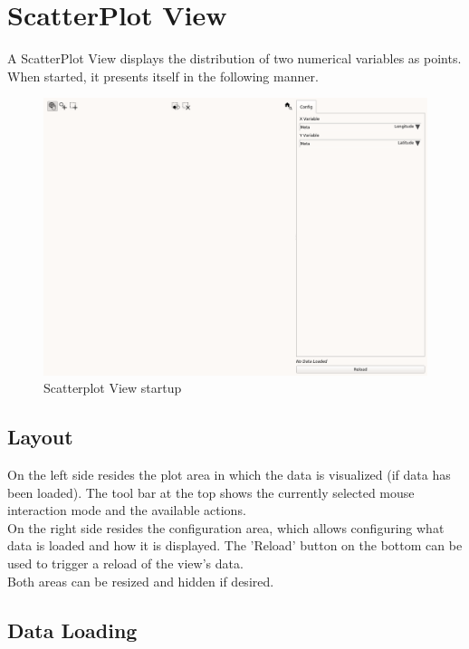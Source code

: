 \chapter{ScatterPlot View}
\label{sec:scatter_view}

A ScatterPlot View displays the distribution of two numerical variables as points. When started, it presents itself in the following manner.

\begin{figure}[H]
    \hspace*{-2cm}
    \includegraphics[width=18cm,frame]{figures/scatter_start.png}
  \caption{Scatterplot View startup}
\end{figure}

\section{Layout}

On the left side resides the plot area in which the data is visualized (if data has been loaded). The tool bar at the top shows the currently selected mouse interaction mode and the available actions.\\

On the right side resides the configuration area, which allows configuring what data is loaded and how it is displayed. The 'Reload' button on the bottom can be used to trigger a reload of the view's data.\\

Both areas can be resized and hidden if desired.

\section{Data Loading}

